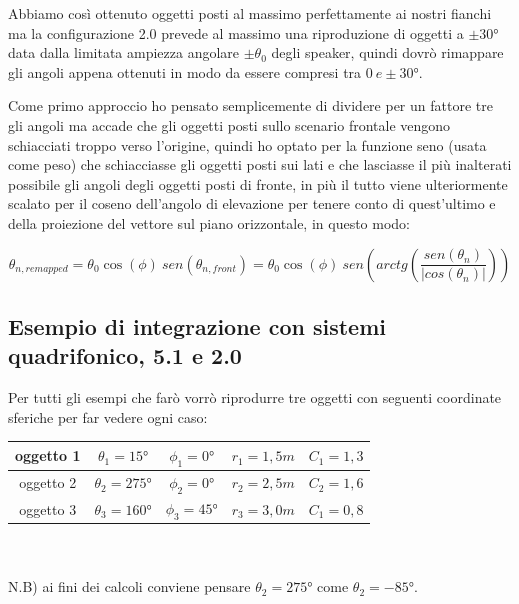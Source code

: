 \documentclass[12pt,a4paper]{report}
\begin{document}
\begin{itemize}
Abbiamo così ottenuto oggetti posti al massimo perfettamente ai nostri fianchi ma la configurazione 2.0 prevede al massimo una riproduzione di oggetti a $\pm 30°$ data dalla limitata ampiezza angolare $\pm \theta_0$ degli speaker, quindi dovrò rimappare gli angoli appena ottenuti in modo da essere compresi tra $0\ e \pm 30°$.

Come primo approccio ho pensato semplicemente di dividere per un fattore tre gli angoli ma accade che gli oggetti posti sullo scenario frontale vengono schiacciati troppo verso l'origine, quindi ho optato per la funzione seno (usata come peso) che schiacciasse gli oggetti posti sui lati e che lasciasse il più inalterati possibile gli angoli degli oggetti posti di fronte, in più il tutto viene ulteriormente scalato per il coseno dell'angolo di elevazione per tenere conto di quest'ultimo e della proiezione del vettore sul piano orizzontale, in questo modo:

\begin{equation}
\theta_{n, remapped}= \theta_0 \cos(\phi) \ sen (\theta_{n,front}) = \theta_0 \cos(\phi)\ sen \left( arctg  \left( \dfrac{sen(\theta_n)}{\vert cos(\theta_n)\vert } \right)\right)
\label{mmmm}
\end{equation}





\subsection{Esempio di integrazione con sistemi quadrifonico, 5.1 e 2.0}

Per tutti gli esempi che farò vorrò riprodurre tre oggetti con seguenti coordinate sferiche per far vedere ogni caso:\\

\begin{tabular}{|c|c|c|c|c|}
\hline
oggetto 1 & $\theta_1=15°$ & $\phi_1=0°$ & $r_1=1,5m$ & $C_1=1,3$ \\
\hline
oggetto 2 & $\theta_2=275°$ & $\phi_2=0°$ & $r_2=2,5m$ & $C_2=1,6$ \\
\hline
oggetto 3 & $\theta_3=160°$ & $\phi_3=45°$ & $r_3=3,0m$ & $C_1=0,8$ \\
\hline

\end{tabular} \\ \\

N.B) ai fini dei calcoli conviene pensare $\theta_2=275°$ come $\theta_2=-85°$.\\


\end{itemize}
\end{document}

